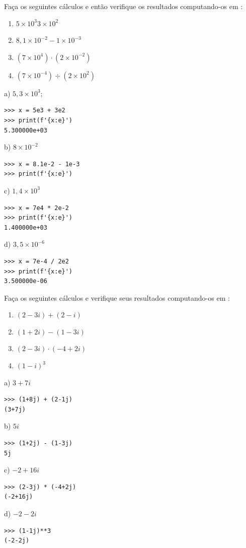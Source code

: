 \begin{exer}
  Faça os seguintes cálculos e então verifique os resultados computando-os em {\python}:
  \begin{enumerate}
  \item $5\times 10^{3} 3\times 10^{2}$
  \item $8,1\times 10^{-2} - 1\times 10^{-3}$
  \item $\left(7\times 10^4\right)\cdot (2\times 10^{-2})$
  \item $\left(7\times 10^{-4}\right)\div (2\times 10^{2})$
  \end{enumerate}
\end{exer}
\begin{resp}
  a) $5,3\times 10^3$;
\begin{lstlisting}
>>> x = 5e3 + 3e2
>>> print(f'{x:e}')
5.300000e+03
\end{lstlisting}
  
  b) $8\times 10^{-2}$
\begin{lstlisting}
>>> x = 8.1e-2 - 1e-3
>>> print(f'{x:e}')

\end{lstlisting}

  c) $1,4\times 10^{3}$

\begin{lstlisting}
>>> x = 7e4 * 2e-2
>>> print(f'{x:e}')
1.400000e+03
\end{lstlisting}

  d) $3,5\times 10^{-6}$

\begin{lstlisting}
>>> x = 7e-4 / 2e2
>>> print(f'{x:e}')
3.500000e-06
\end{lstlisting}
\end{resp}

\begin{exer}
  Faça os seguintes cálculos e verifique seus resultados computando-os em {\python}:
  \begin{enumerate}
  \item $(2-3i) + (2-i)$
  \item $(1+2i) - (1-3i)$
  \item $(2-3i) \cdot (-4+2i)$
  \item $(1-i)^3$
  \end{enumerate}
\end{exer}
\begin{resp}
  a) $3+7i$
\begin{lstlisting}
>>> (1+8j) + (2-1j)
(3+7j)
\end{lstlisting}

  b) $5i$
\begin{lstlisting}
>>> (1+2j) - (1-3j)
5j
\end{lstlisting}

  c) $-2+16i$

\begin{lstlisting}
>>> (2-3j) * (-4+2j)
(-2+16j)
\end{lstlisting}

  d) $-2-2i$
\begin{lstlisting}
>>> (1-1j)**3
(-2-2j)
\end{lstlisting}
\end{resp}

